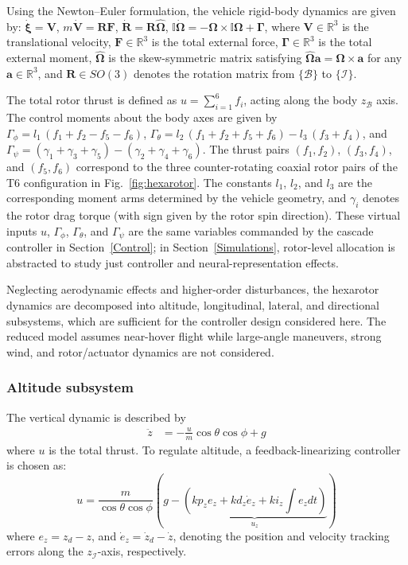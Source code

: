\documentclass[conference]{IEEEtran}
\begin{document}
Using the Newton--Euler formulation, the vehicle rigid-body dynamics are given by: $\dot{\bm{\xi}} = \bm{V} $, $m\dot{\bm{V}} = \bm{R}\bm{F} $, $\dot{\bm{R}} = \bm{R}\hat{\bm{\Omega}}$, $\mathbb{I}\dot{\bm{\Omega}} = -\bm{\Omega}\times\mathbb{I}\bm{\Omega}+\bm{\Gamma}$, where
$\boldsymbol{V}\in\mathbb{R}^3$ is the translational velocity,
$\boldsymbol{F}\in\mathbb{R}^3$ is the total external force,
$\boldsymbol{\Gamma}\in\mathbb{R}^3$ is the total external moment,
$\hat{\boldsymbol{\Omega}}$ is the skew-symmetric matrix satisfying
$\hat{\boldsymbol{\Omega}}\mathbf{a}
=
\boldsymbol{\Omega}\times\mathbf{a}$ for any
$\mathbf{a}\in\mathbb{R}^3$, and
$\boldsymbol{R}\in SO(3)$ denotes the rotation matrix from
$\{\mathcal{B}\}$ to $\{\mathcal{I}\}$.


The total rotor thrust is defined as $u=\sum_{i=1}^{6} f_i$, acting along the body $z_{\mathcal{B}}$ axis. The control moments about the body axes are given by $\Gamma_\phi=l_1\,(f_1+f_2-f_5-f_6)$, $\Gamma_\theta=l_2\,(f_1+f_2+f_5+f_6)-l_3\,(f_3+f_4)$, and $\Gamma_\psi=(\gamma_1+\gamma_3+\gamma_5)-(\gamma_2+\gamma_4+\gamma_6)$. The thrust pairs $(f_1,f_2)$, $(f_3,f_4)$, and $(f_5,f_6)$ correspond to the three counter-rotating coaxial rotor pairs of the T6 configuration in Fig.~\ref{fig:hexarotor}. The constants $l_1$, $l_2$, and $l_3$ are the corresponding moment arms determined by the vehicle geometry, and $\gamma_i$ denotes the rotor drag torque (with sign given by the rotor spin direction). These virtual inputs $u$, $\Gamma_\phi$, $\Gamma_\theta$, and $\Gamma_\psi$ are the same variables commanded by the cascade controller in Section~\ref{Control}; in Section~\ref{Simulations}, rotor-level allocation is abstracted to study just controller and neural-representation effects.

Neglecting aerodynamic effects and higher-order disturbances, the hexarotor dynamics are decomposed into altitude, longitudinal, lateral, and directional subsystems, which are sufficient for the controller design considered here. The reduced model assumes near-hover flight while large-angle maneuvers, strong wind, and rotor/actuator dynamics are not considered.

\subsubsection{Altitude subsystem}
The vertical dynamic is described by
\begin{equation}\label{alt_dynamics}
\begin{aligned}
\ddot z &= -\frac{u }{m}\cos \theta \cos \phi + g 
\end{aligned}
\end{equation}
where $u$ is the total thrust. To regulate altitude, a feedback-linearizing controller is chosen as:
%
\begin{equation}\label{eq:u}
    u= \frac{m}{\cos\theta \cos \phi}\left( g - \underbrace{\left(kp_z e_z+kd_z \dot e_z +ki_z\int e_zdt\right)}_{u_z}\right)
\end{equation}
%
where $e_z=z_d-z$, and $\dot e_z=\dot z_d-\dot z$, denoting the position and velocity tracking errors along the $z_\mathcal{I}$-axis, respectively.
\end{document}
